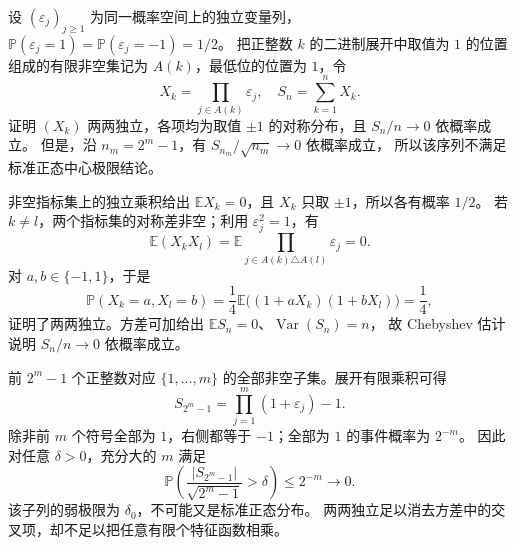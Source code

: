 \begin{optionalexercise}\label{b1:ex:30-pairwise-clt-failure}
设 \((\varepsilon_j)_{j\geq1}\) 为同一概率空间上的独立变量列，
\(\mathbb P(\varepsilon_j=1)=\mathbb P(\varepsilon_j=-1)=1/2\)。
把正整数 \(k\) 的二进制展开中取值为 \(1\) 的位置组成的有限非空集记为 \(A(k)\)，最低位的位置为 \(1\)，令
\[
 X_k=\prod_{j\in A(k)}\varepsilon_j,\quad S_n=\sum_{k=1}^nX_k.
\]
证明 \((X_k)\) 两两独立，各项均为取值 \(\pm1\) 的对称分布，且 \(S_n/n\to0\) 依概率成立。
但是，沿 \(n_m=2^m-1\)，有 \(S_{n_m}/\sqrt{n_m}\to0\) 依概率成立，
所以该序列不满足标准正态中心极限结论。
\end{optionalexercise}
\begin{solution}
非空指标集上的独立乘积给出 \(\mathbb EX_k=0\)，且 \(X_k\) 只取 \(\pm1\)，所以各有概率 \(1/2\)。
若 \(k\ne l\)，两个指标集的对称差非空；利用 \(\varepsilon_j^2=1\)，有
\[
 \mathbb E(X_kX_l)
 =\mathbb E\prod_{j\in A(k)\triangle A(l)}\varepsilon_j=0.
\]
对 \(a,b\in\{-1,1\}\)，于是
\[
 \mathbb P(X_k=a,X_l=b)
 =\frac14\mathbb E\bigl((1+aX_k)(1+bX_l)\bigr)=\frac14,
\]
证明了两两独立。方差可加给出 \(\mathbb ES_n=0\)、\(\operatorname{Var}(S_n)=n\)，
故 Chebyshev 估计说明 \(S_n/n\to0\) 依概率成立。

前 \(2^m-1\) 个正整数对应 \(\{1,\ldots,m\}\) 的全部非空子集。展开有限乘积可得
\[
 S_{2^m-1}=\prod_{j=1}^m(1+\varepsilon_j)-1.
\]
除非前 \(m\) 个符号全部为 \(1\)，右侧都等于 \(-1\)；全部为 \(1\) 的事件概率为 \(2^{-m}\)。
因此对任意 \(\delta>0\)，充分大的 \(m\) 满足
\[
 \mathbb P\left(\frac{|S_{2^m-1}|}{\sqrt{2^m-1}}>\delta\right)\leq2^{-m}\longrightarrow0.
\]
该子列的弱极限为 \(\delta_0\)，不可能又是标准正态分布。
两两独立足以消去方差中的交叉项，却不足以把任意有限个特征函数相乘。
\end{solution}

